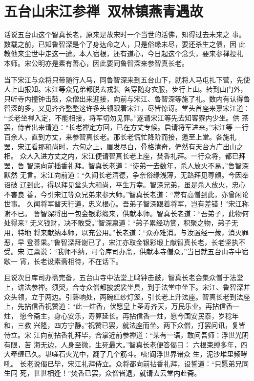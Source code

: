 \chapter{五台山宋江参禅~双林镇燕青遇故}

话说五台山这个智真长老，原来是故宋时一个当世的活佛，知得过去未来之
事。数载之前，已知鲁智深是个了身达命之人，只是俗缘未尽，要还杀生之债，因
此教他来尘世中走这一遭。本人宿根，还有道心，今日起这个念头，要来参禅投礼
本师。宋公明亦是素有善心，因此要同鲁智深来参智真长老。

当下宋江与众将只带随行人马，同鲁智深来到五台山下，就将人马屯扎下营，先使
人上山报知。宋江等众兄弟都脱去戎装，各穿随身衣服，步行上山。转到山门外，
只听寺内撞钟击鼓，众僧出来迎接，向前与宋江、鲁智深等施了礼。数内有认得鲁
智深的多，又见齐齐整整这许多头领跟着宋江，尽皆惊讶。堂头首座来禀宋江道：
“长老坐禅入定，不能相接，将军切勿见罪。”遂请宋江等先去知客寮内少坐。供
茶罢，侍者出来请道：“长老禅定方回，已在方丈专候。启请将军进来。”宋江等
一行百余人，直到方丈，来参智真长老。那长老慌忙降阶而接，邀至上堂。各施礼
罢，宋江看那和尚时，六旬之上，眉发尽白，骨格清奇，俨然有天台方广出山之相。
众人入进方丈之内，宋江便请智真长老上座，焚香礼拜。一行众将，都已拜罢，鲁
智深向前插香礼拜。智真长老道：“徒弟一去数年，杀人放火不易。”鲁智深默然
无言。宋江向前道：“久闻长老清德，争奈俗缘浅薄，无路拜见尊颜。今因奉诏破
辽到此，得以拜见堂头大和尚，平生万幸。智深兄弟，虽是杀人放火，忠心不害良
善，今引宋江等众兄弟来参大师。”智真长老道：“常有高僧到此，亦曾闲论世事。
久闻将军替天行道，忠义根心。吾弟子智深跟着将军，岂有差错！”宋江称谢不已。
鲁智深将出一包金银彩缎来，供献本师。智真长老道：“吾弟子，此物何处得来?
无义钱财，决不敢受。”智深禀道：“弟子累经功赏，积聚之物，弟子无用，特地
将来献纳本师，以充公用。”长老道：“众亦难消。与汝置经一藏，消灭罪恶，早
登善果。”鲁智深拜谢已了，宋江亦取金银彩缎上献智真长老，长老坚执不受。宋
江禀说：“我师不纳，可令库司办斋，供献本寺僧众。”当日就五台山寺中宿歇一
宵，长老设素斋相待，不在话下。

且说次日库司办斋完备，五台山寺中法堂上鸣钟击鼓，智真长老会集众僧于法堂
上，讲法参禅。须臾，合寺众僧都披袈裟坐具，到于法堂中坐下。宋江、鲁智深并
众头领，立于两边。引磬响处，两碗红纱灯笼，引长老上升法座。智真长老到法座
上，先拈信香祝赞道：“此一炷香，伏愿皇上圣寿齐天，万民乐业。再拈信香一炷，
愿今斋主，身心安乐，寿算延长。再拈信香一炷，愿今国安民泰，岁稔年和，三教
兴隆，四方宁静。”祝赞已罢，就法座而坐。两下众僧，打罢问讯，复皆侍立。宋
江向前拈香礼拜毕，合掌近前参禅道：“某有一语，敢问吾师：浮世光阴有限，苦
海无边，人身至微，生死最大。”智真长老便答偈曰：
六根束缚多年，四大牵缠已久。堪嗟石火光中，翻了几个筋斗。咦!阎浮世界诸众
生，泥沙堆里频哮吼。
长老说偈已毕，宋江礼拜侍立。众将都向前拈香礼拜，设誓道：“只愿弟兄同生同
死，世世相逢！”焚香已罢，众僧皆退，就请去云堂内赴斋。

